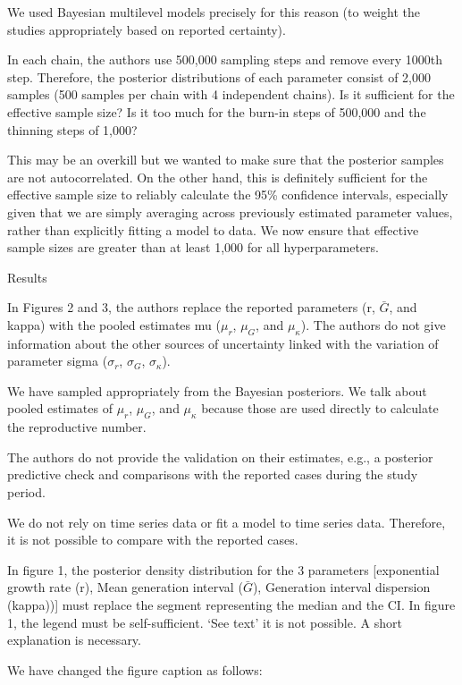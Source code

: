\documentclass[12pt]{article}
\newcommand{\revtext}{\textsf}
\begin{document}
We used Bayesian multilevel models precisely for this reason (to weight the studies appropriately based on reported certainty).

\revtext{In each chain, the authors use 500,000 sampling steps and remove every 1000th step.
Therefore, the posterior distributions of each parameter consist of 2,000 samples (500 samples
per chain with 4 independent chains). Is it sufficient for the effective sample size? Is it too much
for the burn-in steps of 500,000 and the thinning steps of 1,000?}

This may be an overkill but we wanted to make sure that the posterior samples are not autocorrelated.
On the other hand, this is definitely sufficient for the effective sample size to reliably calculate the 95\% confidence intervals, especially given that we are simply averaging across previously estimated parameter values, rather than explicitly fitting a model to data. We now ensure that effective sample sizes are greater than at least 1,000 for all hyperparameters.

\revtext{Results}

\revtext{In Figures 2 and 3, the authors replace the reported parameters (r, $\bar G$, and kappa) with the
pooled estimates mu ($\mu_r$, $\mu_G$, and $\mu_\kappa$). The authors do not give information about
the other sources of uncertainty linked with the variation of parameter sigma ($\sigma_r$, $\sigma_G$,
$\sigma_\kappa$).}

We have sampled appropriately from the Bayesian posteriors. We talk about pooled estimates of $\mu_r$, $\mu_G$, and $\mu_\kappa$ because those are used directly to calculate the reproductive number.

\revtext{The authors do not provide the validation on their estimates, e.g., a posterior predictive check
and comparisons with the reported cases during the study period.}

We do not rely on time series data or fit a model to time series data. Therefore, it is not possible to compare with the reported cases.

\revtext{In figure 1, the posterior density distribution for the 3 parameters [exponential growth rate (r),
Mean generation interval ($\bar G$), Generation interval dispersion (kappa))] must replace the
segment representing the median and the CI. In figure 1, the legend must be self-sufficient. ‘See
text’ it is not possible. A short explanation is necessary.}

We have changed the figure caption as follows:
\end{document}
